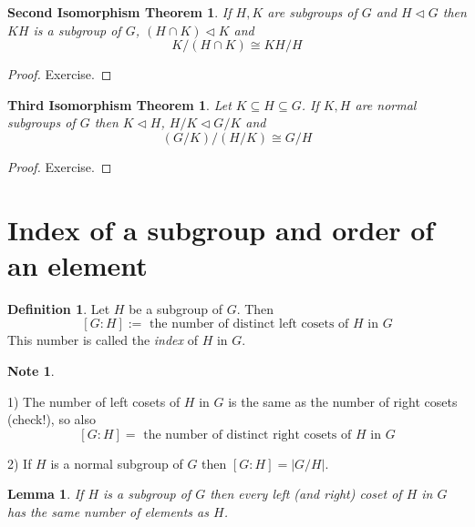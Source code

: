 \documentclass[12pt, letterpaper, oneside]{article}
\theoremstyle{plain}
\newtheorem{lemma}[theorem]{Lemma}
\newtheorem{SIT}[theorem]{Second Isomorphism Theorem}
\newtheorem{TIT}[theorem]{Third Isomorphism Theorem}
\theoremstyle{definition}
\newtheorem{definition}[theorem]{Definition}
\newtheorem{note}[theorem]{Note}
\newcommand{\vs}{\vskip 5mm}
\begin{document}
\begin{SIT}
If $H, K$ are subgroups of $G$ and $H\lhd G$ then $KH$ is a subgroup of $G$,
$(H\cap K) \lhd K$ and 
$$K/(H\cap K) \cong KH/H$$
\end{SIT}


\begin{proof}
Exercise.
\end{proof}

\vs

\begin{TIT}
Let  $K \subseteq H \subseteq G$. If $K, H$ are normal subgroups of $G$  then $K \lhd H$, 
$H/K \lhd G/K$ and 
$$(G/K)/ (H/K) \cong G/H$$
\end{TIT}


\begin{proof} 
Exercise.
\end{proof}





\newpage
\section{Index of a subgroup and order of an element}
\label{SEC_INDEXSUBGP}

\begin{definition}
Let $H$ be a subgroup of $G$. Then 
$$[G\colon H ] := \text{ the number of distinct left cosets of $H$ in $G$} $$
This number is called the \emph{index} of $H$ in $G$.
\end{definition}

\vs\vs

\begin{note} \ \newline

\vskip -7mm

1) The number of left cosets of $H$ in $G$ is the same as the number of right cosets
(check!), so also 
$$[G\colon H ] = \text{ the number of distinct right cosets of $H$ in $G$} $$

2) If $H$ is a normal subgroup of $G$ then $[G:H] = |G/H|$.

\end{note}


\vs\vs 

\begin{lemma}
\label{LEMMA_COSETELTS}
If $H$ is a subgroup of $G$ then every left (and right) coset of $H$ in $G$ has the same number 
of elements  as  $H$. 
\end{lemma}
\end{document}
